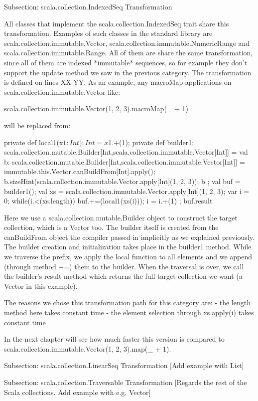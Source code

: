 Subsection: scala.collection.IndexedSeq Transformation

All classes that implement the scala.collection.IndexedSeq trait share this
transformation. Examples of such classes in the standard library are
scala.collection.immutable.Vector, scala.collection.immutable.NumericRange and
scala.collection.immutable.Range. All of them are share the same transformation,
since all of them are indexed *immutable* sequences, so for example they don't
support the update method we saw in the previous category. The transformation
is defined on lines XX-YY. As an example, any macroMap applications on
scala.collection.immutable.Vector like:

scala.collection.immutable.Vector(1, 2, 3).macroMap(_ + 1)

will be replaced from:

{
  private def local1(x$1: Int): Int = x$1.+(1);
  private def builder1:
scala.collection.mutable.Builder[Int,scala.collection.immutable.Vector[Int]] = {
    val b:
scala.collection.mutable.Builder[Int,scala.collection.immutable.Vector[Int]] =
immutable.this.Vector.canBuildFrom[Int].apply();
    b.sizeHint(scala.collection.immutable.Vector.apply[Int](1, 2, 3));
    b
  };
  val buf = builder1();
  val xs = scala.collection.immutable.Vector.apply[Int](1, 2, 3);
  var i = 0;
  while(i.<(xs.length)){
    buf.+=(local1(xs(i)));
    i = i.+(1)
  };
  buf.result
}

Here we use a scala.collection.mutable.Builder object to construct the target
collection, which is a Vector too. The builder itself is created from the
canBuildFrom object the compiler passed in implicitly as we explained
previously. The builder creation and initialization takes place in the
builder1 method. While we traverse the prefix, we apply the local function to
all elements and we append (through method +=) them to the builder. When the
traversal is over, we call the builder's result method which returns the full
target collection we want (a Vector in this example).

The reasons we chose this transformation path for this category are:
- the length method here takes constant time
- the element selection through xs.apply(i) takes constant time

In the next chapter will see how much faster this version is compared to
scala.collection.immutable.Vector(1, 2, 3).map(_ + 1).


Subsection: scala.collection.LinearSeq Transformation
[Add example with List]


Subsection: scala.collection.Traversable Transformation
[Regards the rest of the Scala collections. Add example with e.g. Vector]
